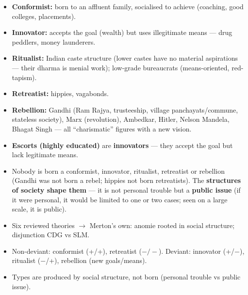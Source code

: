 \begin{ExampleBox}
\begin{itemize}
\item \textbf{Conformist:} born to an affluent family, socialised to achieve (coaching, good colleges, placements).
\item \textbf{Innovator:} accepts the goal (wealth) but uses illegitimate means --- drug peddlers, money launderers.
\item \textbf{Ritualist:} Indian caste structure (lower castes have no material aspirations --- their dharma is menial work); low-grade bureaucrats (means-oriented, red-tapism).
\item \textbf{Retreatist:} hippies, vagabonds.
\item \textbf{Rebellion:} Gandhi (Ram Rajya, trusteeship, village panchayats/commune, stateless society), Marx (revolution), Ambedkar, Hitler, Nelson Mandela, Bhagat Singh --- all ``charismatic'' figures with a new vision.
\item \textbf{Escorts (highly educated)} are \textbf{innovators} --- they accept the goal but lack legitimate means.
\end{itemize}
\end{ExampleBox}

\begin{CriticalPoint}
\begin{itemize}
\item Nobody is born a conformist, innovator, ritualist, retreatist or rebellion (Gandhi was not born a rebel; hippies not born retreatists). The \textbf{structures of society shape them} --- it is not personal trouble but a \textbf{public issue} (if it were personal, it would be limited to one or two cases; seen on a large scale, it is public).
\end{itemize}
\end{CriticalPoint}

\begin{QuickRevision}
\begin{itemize}
\item Six reviewed theories $\rightarrow$ Merton's own: anomie rooted in social structure; disjunction CDG vs SLM.
\item Non-deviant: conformist (+/+), retreatist ($-/-$). Deviant: innovator (+/$-$), ritualist ($-$/+), rebellion (new goals/means).
\item Types are produced by social structure, not born (personal trouble vs public issue).
\end{itemize}
\end{QuickRevision}

